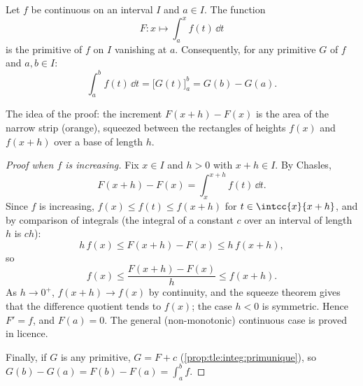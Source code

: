 \begin{theorem}\label{thm:tle:integ:ftc}
Let $f$ be continuous on an interval $I$ and $a \in I$. The function
\[
F \colon x \longmapsto \int_a^x f(t)\,\dd t
\]
is the primitive of $f$ on $I$ vanishing at $a$. Consequently, for any
primitive $G$ of $f$ and $a, b \in I$:
\[
\int_a^b f(t)\,\dd t = \bigl[G(t)\bigr]_a^b = G(b) - G(a).
\]
\end{theorem}

\begin{omfigure}

{\small The idea of the proof: the increment $F(x+h) - F(x)$ is the area
of the narrow strip (orange), squeezed between the rectangles of heights
$f(x)$ and $f(x+h)$ over a base of length $h$.}
\end{omfigure}

\begin{proof}[Proof when $f$ is increasing]
Fix $x \in I$ and $h > 0$ with $x + h \in I$. By Chasles,
\[
F(x+h) - F(x) = \int_x^{x+h} f(t)\,\dd t .
\]
Since $f$ is increasing, $f(x) \leq f(t) \leq f(x+h)$ for
$t \in \intcc{x}{x+h}$, and by comparison of integrals (the integral of a
constant $c$ over an interval of length $h$ is $ch$):
\[
h\,f(x) \leq F(x+h) - F(x) \leq h\,f(x+h),
\]
so
\[
f(x) \leq \frac{F(x+h) - F(x)}{h} \leq f(x+h).
\]
As $h \to 0^+$, $f(x+h) \to f(x)$ by continuity, and the squeeze theorem
gives that the difference quotient tends to $f(x)$; the case $h < 0$ is
symmetric. Hence $F' = f$, and $F(a) = 0$. The general (non-monotonic)
continuous case is proved in licence.

Finally, if $G$ is any primitive, $G = F + c$
(\cref{prop:tle:integ:primunique}), so
$G(b) - G(a) = F(b) - F(a) = \int_a^b f$.
\end{proof}

